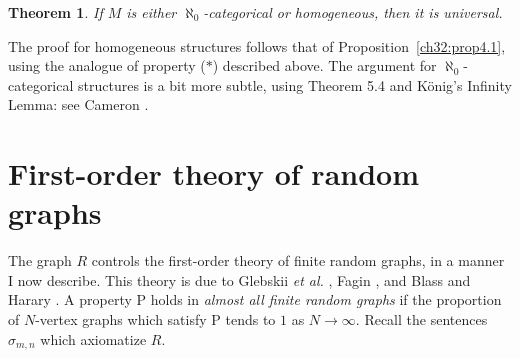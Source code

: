 \documentclass{book}
\newtheorem{theorem}{Theorem}
\begin{document}
\begin{theorem}\label{ch32:them5.3} 
If $M$ is either $\aleph_0$-categorical or homogeneous, then it is universal.
\end{theorem}

The proof for homogeneous structures follows that of
Proposition~\ref{ch32:prop4.1}, using the analogue of property
($\ast$) described above. The argument for $\aleph_0$-categorical
structures is a bit more subtle, using Theorem 5.4 and K\"{o}nig's
Infinity Lemma: see Cameron \cite{ch32:bib7}.

\section{First-order theory of random graphs}%
\label{ch32:sec2.6}

The graph $R$ controls the first-order theory of finite random
graphs, in a manner I now describe. This theory is due to Glebskii
{\it et al.} \cite{ch32:bib24}, Fagin \cite{ch32:bib20}, and
Blass and Harary \cite{ch32:bib2}. A property P holds in
\emph{almost all finite random graphs} if the proportion of
$N$-vertex graphs which satisfy P tends to $1$ as $N \rightarrow
\infty$. Recall the sentences $\sigma_{m,n}$ which axiomatize $R$.
\end{document}

